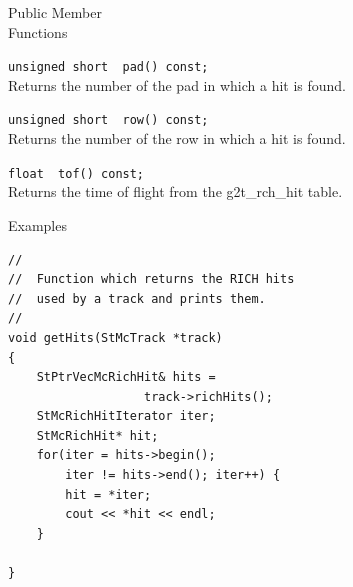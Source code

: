 \begin{Entry}
\item[Public Member\\ Functions]

    \verb+unsigned short  pad() const;+\\
    Returns the number of the pad in which a hit is found. 

    \verb+unsigned short  row() const;+\\
    Returns the number of the row in which a hit is found. 

    \verb+float  tof() const;+\\
    Returns the time of flight from the g2t\_rch\_hit table.

\item[Examples]
{\footnotesize
\begin{verbatim}
//
//  Function which returns the RICH hits
//  used by a track and prints them.
//
void getHits(StMcTrack *track)
{
    StPtrVecMcRichHit& hits =
                   track->richHits();
    StMcRichHitIterator iter;
    StMcRichHit* hit;
    for(iter = hits->begin();
        iter != hits->end(); iter++) {
        hit = *iter;
        cout << *hit << endl;
    }
    
}
\end{verbatim}
}%
\end{Entry}
\clearpage
%
%
